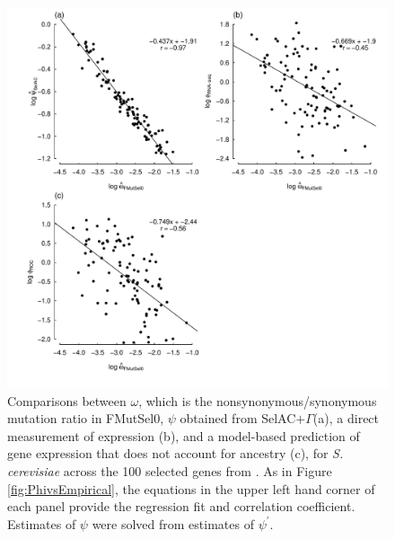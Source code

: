 \documentclass[12pt,letterpaper]{article}
\newcommand{\selacplusgamma}{SelAC$+\Gamma$\xspace}
\newcommand{\psiprime}{\ensuremath{\psi^\prime}\xspace}
\begin{document}
\begin{figure}[H]
  \centering
  \includegraphics[width=0.9\linewidth]{FIGURE_2_MutSelOmega_vs_Us_ROC_Scer_only.pdf}
  \caption{Comparisons between $\omega$, which is the nonsynonymous/synonymous mutation ratio in FMutSel0, $\psi$ obtained from \selacplusgamma (a), a direct measurement of expression (b), and a model-based prediction of gene expression that does not account for ancestry (c), for \emph{S. cerevisiae} across the 100 selected genes from \citet{SalichosAndRokas2013}.
    As in Figure \ref{fig:PhivsEmpirical}, the equations in the upper left hand corner of each panel provide the regression fit and correlation coefficient.
    Estimates of $\psi$ were solved from estimates of $\psiprime$.
  }
  \label{fig:OmegavsPsi}
\end{figure}
\end{document}

